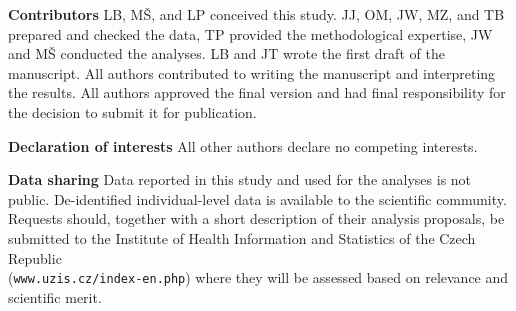 \documentclass[preprint,12pt,authoryear]{elsarticle}
\begin{document}

{\bf Contributors} LB, M\v{S}, and LP conceived this study. JJ, OM, JW, MZ, and TB prepared and checked the data, TP provided the methodological expertise, JW and M\v{S} conducted the analyses. LB and JT wrote the first draft of the manuscript. All authors contributed to writing the manuscript and interpreting the results. All authors approved the final version and had final responsibility for the decision to submit it for publication. 

{\bf Declaration of interests} All other authors declare no competing interests.

{\bf Data sharing} Data reported in this study and used for the analyses is not public. De-identified individual-level data is available to the scientific community. Requests should, together with a short description of their analysis proposals, be submitted to the Institute of Health Information and Statistics of the Czech Republic \\ ({\tt www.uzis.cz/index-en.php}) where they will be assessed based on relevance and scientific merit.



 


\end{document}
